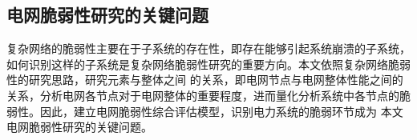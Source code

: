 \subsection{电网脆弱性研究的关键问题}

复杂网络的脆弱性主要在于子系统的存在性，即存在能够引起系统崩溃的子系统，如何识别这样的子系统是复杂网络脆弱性研究的重要方向。本文依照复杂网络脆弱性的研究思路，研究元素与整体之间
的关系，即电网节点与电网整体性能之间的关系，分析电网各节点对于电网整体的重要程度，进而量化分析系统中各节点的脆弱性。因此，建立电网脆弱性综合评估模型，识别电力系统的脆弱环节成为
本文电网脆弱性研究的关键问题。







